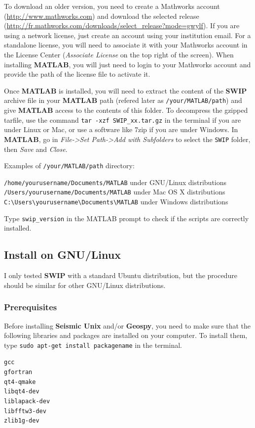 \documentclass[twoside,a4paper]{article}
\def\SWIP{\textbf{SWIP}}
\def\SeismicUnix{\textbf{Seismic Unix}}
\def\Geopsy{\textbf{Geospy}}
\def\MATLAB{\textbf{MATLAB}}
\begin{document}
To download an older version, you need to create a Mathworks account (\url{http://www.mathworks.com}) and download the selected release (\url{http://fr.mathworks.com/downloads/select_release?mode=gwylf}). If you are using a network license, just create an account using your institution email. For a standalone license, you will need to associate it with your Mathworks account in the License Center (\textit{Associate License} on the top right of the screen). When installing {\MATLAB}, you will just need to login to your Mathworks account and provide the path of the license file to activate it.

Once {\MATLAB} is installed, you will need to extract the content of the {\SWIP} archive file in your {\MATLAB} path (refered later as \verb|/your/MATLAB/path|) and give {\MATLAB} access to the contents of this folder. To decompress the gzipped tarfile, use the command \verb|tar -xzf SWIP_xx.tar.gz| in the terminal if you are under Linux or Mac, or use a software like 7zip if you are under Windows. In {\MATLAB}, go in \textit{File->Set Path->Add with Subfolders} to select the \verb|SWIP| folder, then \textit{Save} and \textit{Close}.

Examples of \verb|/your/MATLAB/path| directory:

\verb|/home/yourusername/Documents/MATLAB| under GNU/Linux distributions\\
\verb|/Users/yourusername/Documents/MATLAB| under Mac OS X distributions\\
\verb|C:\Users\yourusername\Documents\MATLAB| under Windows distributions

Type \verb|swip_version| in the MATLAB prompt to check if the scripts are correctly installed.

\clearpage
\subsection{Install on GNU/Linux}
I only tested {\SWIP} with a standard Ubuntu distribution, but the procedure should be similar for other GNU/Linux distributions.
\subsubsection{Prerequisites}
Before installing {\SeismicUnix} and/or {\Geopsy}, you need to make sure that the following libraries and packages are installed on your computer. To install them, type \verb|sudo apt-get install packagename| in the terminal.

\verb|gcc|\\
\verb|gfortran|\\
\verb|qt4-qmake|\\
\verb|libqt4-dev|\\
\verb|liblapack-dev|\\
\verb|libfftw3-dev|\\
\verb|zlib1g-dev|
\end{document}

